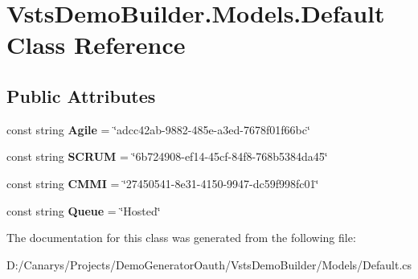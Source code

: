 \hypertarget{class_vsts_demo_builder_1_1_models_1_1_default}{}\section{Vsts\+Demo\+Builder.\+Models.\+Default Class Reference}
\label{class_vsts_demo_builder_1_1_models_1_1_default}
\subsection*{Public Attributes}
\begin{DoxyCompactItemize}
\item 
\mbox{\label{class_vsts_demo_builder_1_1_models_1_1_default_a834adb000f112c563b53a3e4bcd7556f}} 
const string {\bfseries Agile} = \char`\"{}adcc42ab-\/9882-\/485e-\/a3ed-\/7678f01f66bc\char`\"{}
\item 
\mbox{\label{class_vsts_demo_builder_1_1_models_1_1_default_af36e8fdd6c0363967684cadcf557987a}} 
const string {\bfseries S\+C\+R\+UM} = \char`\"{}6b724908-\/ef14-\/45cf-\/84f8-\/768b5384da45\char`\"{}
\item 
\mbox{\label{class_vsts_demo_builder_1_1_models_1_1_default_a573c93615c5f14cac91a142f154d1e05}} 
const string {\bfseries C\+M\+MI} = \char`\"{}27450541-\/8e31-\/4150-\/9947-\/dc59f998fc01\char`\"{}
\item 
\mbox{\label{class_vsts_demo_builder_1_1_models_1_1_default_a121050e849c5ce86c3a08223dcc680b4}} 
const string {\bfseries Queue} = \char`\"{}Hosted\char`\"{}
\end{DoxyCompactItemize}


The documentation for this class was generated from the following file\+:\begin{DoxyCompactItemize}
\item 
D\+:/\+Canarys/\+Projects/\+Demo\+Generator\+Oauth/\+Vsts\+Demo\+Builder/\+Models/Default.\+cs\end{DoxyCompactItemize}
